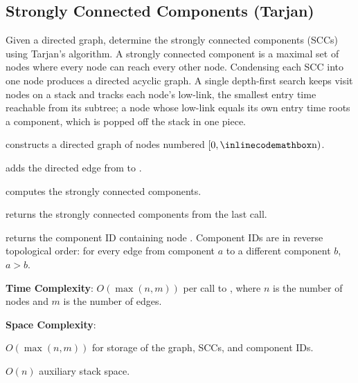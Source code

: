 \subsection{Strongly Connected Components (Tarjan)}
\label{sec:4.2.3}
Given a directed graph, determine the strongly connected components (SCCs) using Tarjan's algorithm. A strongly connected component is a maximal set of nodes where every node can reach every other node. Condensing each SCC into one node produces a directed acyclic graph. A single depth-first search keeps visit nodes on a stack and tracks each node's low-link, the smallest entry time reachable from its subtree; a node whose low-link equals its own entry time roots a component, which is popped off the stack in one piece.

\begin{compactitem}
  \item {} constructs a directed graph of  nodes numbered $[0, {\inlinecodemath{n}})$.
  \item {} adds the directed edge from  to .
  \item {} computes the strongly connected components.
  \item {} returns the strongly connected components from the last  call.
  \item {} returns the component ID containing node . Component IDs are in reverse topological order: for every edge from component $a$ to a different component $b$, $a > b$.
\end{compactitem}

\textbf{Time Complexity}: $O(\max\left(n, m\right))$ per call to , where $n$ is the number of nodes and $m$ is the number of edges.

\textbf{Space Complexity}:
\begin{compactitem}
  \item $O(\max\left(n, m\right))$ for storage of the graph, SCCs, and component IDs.
  \item $O(n)$ auxiliary stack space.
\end{compactitem}

